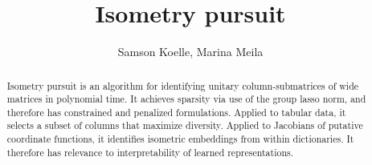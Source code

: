 \documentclass[a4paper,11pt]{article}
\begin{document}
\title{Isometry pursuit}
\author{Samson Koelle, Marina Meila}

\maketitle

\begin{abstract}

Isometry pursuit is an algorithm for identifying unitary column-submatrices of wide matrices in polynomial time. %
It achieves sparsity via use of the group lasso norm, and therefore has constrained and penalized formulations.
Applied to tabular data, it selects a subset of columns that maximize diversity.
Applied to Jacobians of putative coordinate functions, it identifies isometric embeddings from within dictionaries.
It therefore has relevance to interpretability of learned representations.

\end{abstract}







\end{document}
